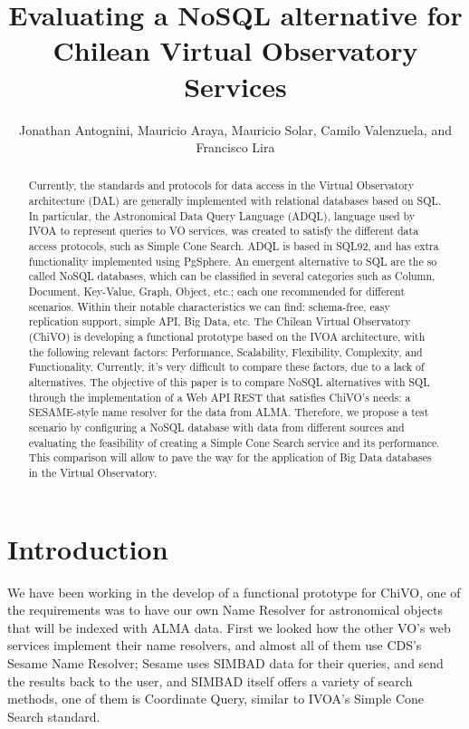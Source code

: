 \documentclass[11pt,twoside]{article}
\begin{document}
\title{Evaluating a NoSQL alternative for Chilean Virtual Observatory Services}
\author{Jonathan Antognini,  Mauricio Araya, Mauricio Solar, Camilo Valenzuela, and  Francisco Lira
}

\begin{abstract}
Currently, the standards and protocols for data access in the Virtual Observatory architecture (DAL) are generally implemented with
relational databases based on SQL. In particular, the Astronomical Data Query Language (ADQL), language used by IVOA to represent 
queries to VO services, was created to satisfy the different data access protocols, such as Simple Cone Search. ADQL is based in 
SQL92, and has extra functionality implemented using PgSphere. An emergent alternative to SQL are the so called NoSQL databases, 
which can be classified in several categories such as Column, Document, Key-Value, Graph, Object, etc.; each one recommended for 
different scenarios. Within their notable characteristics we can find: schema-free, easy replication support, simple API, Big Data,
etc. The Chilean Virtual Observatory (ChiVO) is developing a functional prototype based on the IVOA architecture, with the following
relevant factors: Performance, Scalability, Flexibility, Complexity, and Functionality. Currently, it's very difficult to compare 
these factors, due to a lack of alternatives. The objective of this paper is to compare NoSQL alternatives with SQL through the 
implementation of a Web API REST that satisfies ChiVO's needs: a SESAME-style name resolver for the data from ALMA. Therefore, 
we propose a test scenario by configuring a NoSQL database with data from different sources and evaluating the feasibility of 
creating a Simple Cone Search service and its performance. This comparison will allow to pave the way for the application of 
Big Data databases in the Virtual Observatory.
\end{abstract}

\section{Introduction}
We have been working in the develop of a functional prototype for ChiVO, one of the requirements was to have our own Name Resolver
for astronomical objects that will be indexed with ALMA data. First we looked how the other VO’s web services implement their name 
resolvers, and almost all of them use CDS’s Sesame Name Resolver; Sesame uses SIMBAD  data for their queries, and send the results
back to the user, and SIMBAD itself offers a variety of search methods, one of them is Coordinate Query, similar to IVOA’s 
Simple Cone Search standard.
\end{document}
